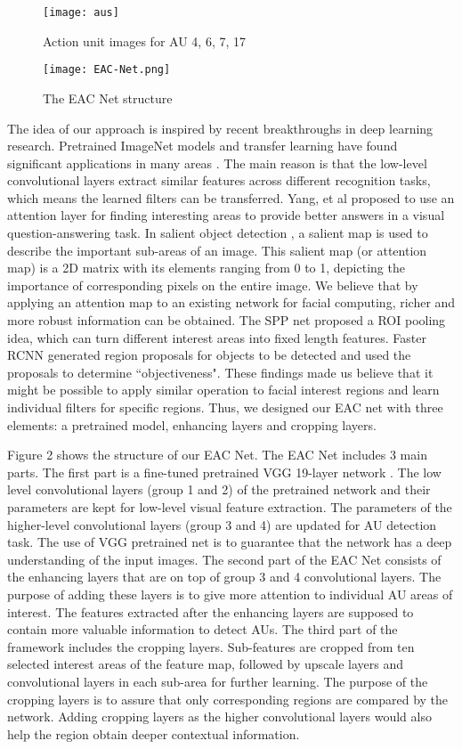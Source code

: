 \documentclass[a4paper, 10pt, conference]{ieeeconf}      %
\begin{document}
   \begin{figure}[thpb]
      \centering
      \texttt{[image: aus]}
      \caption{Action unit images for AU 4, 6, 7, 17}
      \label{fig1}
   \end{figure}


 \begin{figure*}[thpb]
      \centering
      \texttt{[image: EAC-Net.png]}
      \caption{The EAC Net structure}
      \label{fig2}
   \end{figure*}
The idea of our approach is inspired by recent breakthroughs in deep learning research. Pretrained ImageNet models and transfer learning have found significant applications in many areas \cite{p2, p3}. The main reason is that the low-level convolutional layers extract similar features across different recognition tasks, which means the learned filters can be transferred.
Yang, et al \cite{p4} proposed to use an attention layer for finding interesting areas to provide better answers in a visual question-answering task. In salient object detection \cite{p5}, a salient map is used to describe the important sub-areas of an image. This salient map (or attention map) is a 2D matrix with its elements ranging from 0 to 1, depicting the importance of corresponding pixels on the entire image. We believe that by applying an attention map to an existing network for facial computing, richer and more robust information can be obtained.
The SPP net \cite{p6} proposed a ROI pooling idea, which can turn different interest areas into fixed length features. Faster RCNN \cite{p7} generated region proposals for objects to be detected and used the proposals to determine ``objectiveness". These findings made us believe that it might be possible to apply similar operation to facial interest regions and learn individual filters for specific regions.
Thus, we designed our EAC net with three elements: a pretrained model, enhancing layers and cropping layers.


Figure 2 shows the structure of our EAC Net. The EAC Net includes 3 main parts. The first part is a fine-tuned pretrained VGG 19-layer network \cite{p8}. The low level convolutional layers (group 1 and 2) of the pretrained network and their parameters are kept for low-level visual feature extraction. The parameters of the higher-level convolutional layers (group 3 and 4) are updated for AU detection task. The use of VGG pretrained net is to guarantee that the network has a deep understanding of the input images. The second part of the EAC Net consists of the enhancing layers that are on top of group 3 and 4 convolutional layers. The purpose of adding these layers is to give more attention to individual AU areas of interest. The features extracted after the enhancing layers are supposed to contain more valuable information to detect AUs. The third part of the framework includes the cropping layers. Sub-features are cropped from ten selected interest areas of the feature map, followed by upscale layers and convolutional layers in each sub-area for further learning. The purpose of the cropping layers is to assure that only corresponding regions are compared by the network. Adding cropping layers as the higher convolutional layers would also help the region obtain deeper contextual information.
\end{document}
